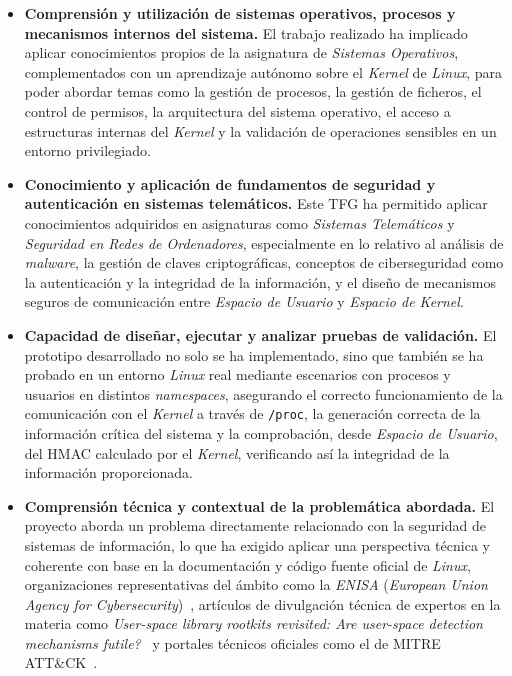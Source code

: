 \begin{itemize}
    \item \textbf{Comprensión y utilización de sistemas operativos, procesos y mecanismos internos del sistema.} El trabajo realizado ha implicado aplicar conocimientos propios de la asignatura de \textit{Sistemas Operativos}, complementados con un aprendizaje autónomo sobre el \textit{Kernel} de \textit{Linux}, para poder abordar temas como la gestión de procesos, la gestión de ficheros, el control de permisos, la arquitectura del sistema operativo, el acceso a estructuras internas del \textit{Kernel} y la validación de operaciones sensibles en un entorno privilegiado.
    
    \item \textbf{Conocimiento y aplicación de fundamentos de seguridad y autenticación en sistemas telemáticos.} Este TFG ha permitido aplicar conocimientos adquiridos en asignaturas como \textit{Sistemas Telemáticos} y \textit{Seguridad en Redes de Ordenadores}, especialmente en lo relativo al análisis de \textit{malware}, la gestión de claves criptográficas, conceptos de ciberseguridad como la autenticación y la integridad de la información, y el diseño de mecanismos seguros de comunicación entre \textit{Espacio de Usuario} y \textit{Espacio de Kernel}.
        
    \item \textbf{Capacidad de diseñar, ejecutar y analizar pruebas de validación.} El prototipo desarrollado no solo se ha implementado, sino que también se ha probado en un entorno \textit{Linux} real mediante escenarios con procesos y usuarios en distintos \textit{namespaces}, asegurando el correcto funcionamiento de la comunicación con el \textit{Kernel} a través de \texttt{/proc}, la generación correcta de la información crítica del sistema y la comprobación, desde \textit{Espacio de Usuario}, del HMAC calculado por el \textit{Kernel}, verificando así la integridad de la información proporcionada.
    
    \item \textbf{Comprensión técnica y contextual de la problemática abordada.} El proyecto aborda un problema directamente relacionado con la seguridad de sistemas de información, lo que ha exigido aplicar una perspectiva técnica y coherente con base en la documentación y código fuente oficial de \textit{Linux}, organizaciones representativas del ámbito como la \textit{ENISA} (\textit{European Union Agency for Cybersecurity})~\cite{threat_enisa}, artículos de divulgación técnica de expertos en la materia como \textit{User-space library rootkits revisited: Are user-space detection mechanisms futile?}~\cite{rootkits} y portales técnicos oficiales como el de MITRE ATT\&CK~\cite{mitre_attack}.
\end{itemize}

